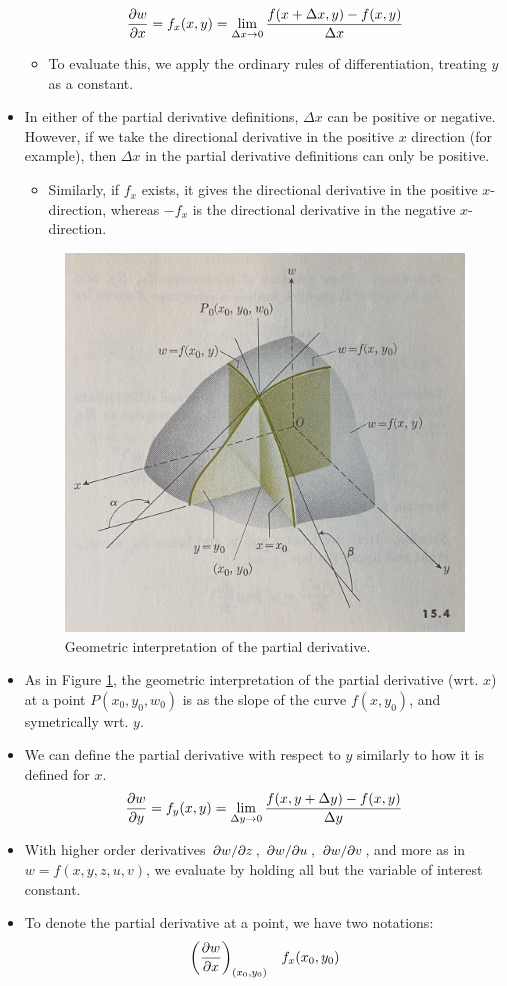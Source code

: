 \documentclass[../main.tex]{subfiles}
\begin{document}
\begin{itemize}
    \begin{equation*}
        \pdv{w}{x} = f_x(x,y) = \lim_{\Delta x\to 0}\frac{f(x+\Delta x,y)-f(x,y)}{\Delta x}
    \end{equation*}
    \begin{itemize}
        \item To evaluate this, we apply the ordinary rules of differentiation, treating $y$ as a constant. 
    \end{itemize}
    \item In either of the partial derivative definitions, $\Delta x$ can be positive or negative. However, if we take the directional derivative in the positive $x$ direction (for example), then $\Delta x$ in the partial derivative definitions can only be positive.
    \begin{itemize}
        \item Similarly, if $f_x$ exists, it gives the directional derivative in the positive $x$-direction, whereas $-f_x$ is the directional derivative in the negative $x$-direction.
    \end{itemize}
    \begin{figure}[h!]
        \centering
        \includegraphics[width=0.4\linewidth]{ExtFiles/geometricPartialDv.jpg}
        \caption{Geometric interpretation of the partial derivative.}
        \label{fig:geometricPartialDv}
    \end{figure}
    \item As in Figure \ref{fig:geometricPartialDv}, the geometric interpretation of the partial derivative (wrt. $x$) at a point $P(x_0,y_0,w_0)$ is as the slope of the curve $f(x,y_0)$, and symetrically wrt. $y$.
    \item We can define the partial derivative with respect to $y$ similarly to how it is defined for $x$.
    \begin{equation*}
        \pdv{w}{y} = f_y(x,y) = \lim_{\Delta y\to 0}\frac{f(x,y+\Delta y)-f(x,y)}{\Delta y}
    \end{equation*}
    \item With higher order derivatives $\pdv*{w}{z}$, $\pdv*{w}{u}$, $\pdv*{w}{v}$, and more as in $w=f(x,y,z,u,v)$, we evaluate by holding all but the variable of interest constant.
    \item To denote the partial derivative at a point, we have two notations:
    \begin{align*}
        \left( \pdv{w}{x} \right)_{(x_0,y_0)}&&
            f_x(x_0,y_0)
    \end{align*}
\end{itemize}
\end{document}

